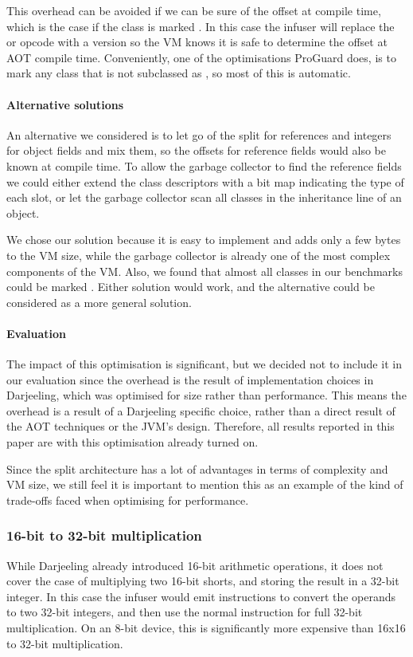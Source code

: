 This overhead can be avoided if we can be sure of the offset at compile time, which is the case if the class is marked . In this case the infuser will replace the  or  opcode with a  version so the VM knows it is safe to determine the offset at AOT compile time. Conveniently, one of the optimisations ProGuard does, is to mark any class that is not subclassed as , so most of this is automatic.

\paragraph{Alternative solutions} An alternative we considered is to let go of the split for references and integers for object fields and mix them, so the offsets for reference fields would also be known at compile time. To allow the garbage collector to find the reference fields we could either extend the class descriptors with a bit map indicating the type of each slot, or let the garbage collector scan all classes in the inheritance line of an object.

We chose our solution because it is easy to implement and adds only a few bytes to the VM size, while the garbage collector is already one of the most complex components of the VM. Also, we found that almost all classes in our benchmarks could be marked . Either solution would work, and the alternative could be considered as a more general solution.

\paragraph{Evaluation}
The impact of this optimisation is significant, but we decided not to include it in our evaluation since the overhead is the result of implementation choices in Darjeeling, which was optimised for size rather than performance. This means the overhead is a result of a Darjeeling specific choice, rather than a direct result of the AOT techniques or the JVM's design. Therefore, all results reported in this paper are with this optimisation already turned on.

Since the split architecture has a lot of advantages in terms of complexity and VM size, we still feel it is important to mention this as an example of the kind of trade-offs faced when optimising for performance.

\subsubsection{ 16-bit to 32-bit multiplication}
While Darjeeling already introduced 16-bit arithmetic operations, it does not cover the case of multiplying two 16-bit shorts, and storing the result in a 32-bit integer. In this case the infuser would emit  instructions to convert the operands to two 32-bit integers, and then use the normal  instruction for full 32-bit multiplication. On an 8-bit device, this is significantly more expensive than 16x16 to 32-bit multiplication.

